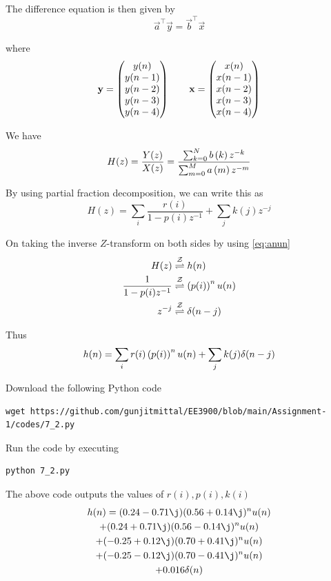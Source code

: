 \documentclass[journal,12pt,twocolumn]{IEEEtran}
\renewcommand\thesection{\arabic{section}}
\begin{document}
\begin{enumerate}[label=\thesection.\arabic*]
	The difference equation is then given by
	\begin{equation}
		\vec{a}^\top \vec{y} = \vec{b}^\top \vec{x} 
	\end{equation}
	
	where
	\begin{align}
		\mathbf{y} = \begin{pmatrix}y(n) \\ y(n-1) \\ y(n-2) \\ y(n-3) \\ y(n-4)\end{pmatrix} \qquad
		\mathbf{x} = \begin{pmatrix}x(n) \\ x(n-1) \\ x(n-2) \\ x(n-3) \\ x(n-4)\end{pmatrix}
	\end{align}
	
	We have
	\begin{equation}
		H(z) = \frac{Y(z)}{X(z)} = \frac{\sum _{k=0}^{N}b\left(k\right) z^{-k}}{\sum _{m=0}^{M}a\left(m\right) z^{-m}}
	\end{equation}
	
	By using partial fraction decomposition, we can write this as
	\begin{equation}
		H(z) = \sum_i \frac{r(i)}{1-p(i)z^{-1}} + \sum_j k(j)z^{-j}
	\end{equation}
	
	On taking the inverse $Z$-transform on both sides by using \eqref{eq:anun}
	\begin{align}
		H(z) &\overset{\mathcal{Z}}{ \rightleftharpoons} h(n) \\
		\frac{1}{1-p(i)z^{-1}} &\overset{\mathcal{Z}}{ \rightleftharpoons} \left(p(i)\right)^nu(n) \\
		z^{-j} &\overset{\mathcal{Z}}{ \rightleftharpoons} \delta(n-j) 
	\end{align}
	
	Thus
	\begin{align}
		h(n) = \sum_i r(i)\left(p(i)\right)^nu(n) + \sum_j k(j)\delta(n-j)
	\end{align}
	
	Download the following Python code
	\begin{lstlisting}
wget https://github.com/gunjitmittal/EE3900/blob/main/Assignment-1/codes/7_2.py
	\end{lstlisting}
	
	Run the code by executing
	\begin{lstlisting}
python 7_2.py
	\end{lstlisting}
	
	The above code outputs the values of $r(i), p(i), k(i)$
	\begin{multline}
		h(n) = 
		 (0.24 - 0.71\j)(0.56 + 0.14\j)^n u(n) \\
		+ (0.24 + 0.71\j)(0.56 - 0.14\j)^n u(n) \\
		+ (-0.25 + 0.12\j)(0.70 + 0.41\j)^n u(n) \\
		+ (-0.25 - 0.12\j)(0.70 - 0.41\j)^n u(n) \\
		+ 0.016\delta(n)
	\end{multline}
	

\end{enumerate}
\end{document}
